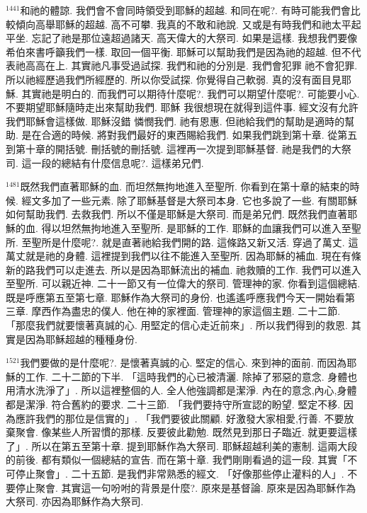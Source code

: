 \documentclass{book}
\begin{document}
$^{1441}$和祂的體諒.
我們會不會同時領受到耶穌的超越.
和同在呢?.
有時可能我們會比較傾向高舉耶穌的超越.
高不可攀.
我真的不敢和祂說.
又或是有時我們和祂太平起平坐.
忘記了祂是那位遠超過諸天.
高天偉大的大祭司.
如果是這樣.
我想我們要像希伯來書呼籲我們一樣.
取回一個平衡.
耶穌可以幫助我們是因為祂的超越.
但不代表祂高高在上.
其實祂凡事受過試探.
我們和祂的分別是.
我們會犯罪 祂不會犯罪.
所以祂經歷過我們所經歷的.
所以你受試探.
你覺得自己軟弱.
真的沒有面目見耶穌.
其實祂是明白的.
而我們可以期待什麼呢?.
我們可以期望什麼呢?.
可能要小心.
不要期望耶穌隨時走出來幫助我們.
耶穌 我很想現在就得到這件事.
經文沒有允許我們耶穌會這樣做.
耶穌沒錯 憐憫我們.
祂有恩惠.
但祂給我們的幫助是適時的幫助.
是在合適的時候.
將對我們最好的東西賜給我們.
如果我們跳到第十章.
從第五到第十章的開括號.
刪括號的刪括號.
這裡再一次提到耶穌基督.
祂是我們的大祭司.
這一段的總結有什麼信息呢?.
這樣弟兄們.

$^{1481}$既然我們直著耶穌的血.
而坦然無拘地進入至聖所.
你看到在第十章的結束的時候.
經文多加了一些元素.
除了耶穌基督是大祭司本身.
它也多說了一些.
有關耶穌如何幫助我們.
去救我們.
所以不僅是耶穌是大祭司.
而是弟兄們.
既然我們直著耶穌的血.
得以坦然無拘地進入至聖所.
是耶穌的工作.
耶穌的血讓我們可以進入至聖所.
至聖所是什麼呢?.
就是直著祂給我們開的路.
這條路又新又活.
穿過了萬丈.
這萬丈就是祂的身體.
這裡提到我們以往不能進入至聖所.
因為耶穌的補血.
現在有條新的路我們可以走進去.
所以是因為耶穌流出的補血.
祂救贖的工作.
我們可以進入至聖所.
可以親近神.
二十一節又有一位偉大的祭司.
管理神的家.
你看到這個總結.
既是呼應第五至第七章.
耶穌作為大祭司的身份.
也遙遙呼應我們今天一開始看第三章.
摩西作為盡忠的僕人.
他在神的家裡面.
管理神的家這個主題.
二十二節.
「那麼我們就要懷著真誠的心.
用堅定的信心走近前來」.
所以我們得到的救恩.
其實是因為耶穌超越的種種身份.

$^{1521}$我們要做的是什麼呢?.
是懷著真誠的心.
堅定的信心.
來到神的面前.
而因為耶穌的工作.
二十二節的下半.
「這時我們的心已被清灑.
除掉了邪惡的意念.
身體也用清水洗淨了」.
所以這裡整個的人.
全人他強調都是潔淨.
內在的意念,內心,身體都是潔淨.
符合舊約的要求.
二十三節.
「我們要持守所宣認的盼望.
堅定不移.
因為應許我們的那位是信實的」.
「我們要彼此關顧.
好激發大家相愛,行善.
不要放棄聚會.
像某些人所習慣的那樣.
反要彼此勸勉.
既然見到那日子臨近.
就更要這樣了」.
所以在第五至第十章.
提到耶穌作為大祭司.
耶穌超越利美的憲制.
這兩大段的前後.
都有類似一個總結的宣告.
而在第十章.
我們剛剛看過的這一段.
其實「不可停止聚會」.
二十五節.
是我們非常熟悉的經文.
「好像那些停止灌料的人」.
不要停止聚會.
其實這一句吩咐的背景是什麼?.
原來是基督論.
原來是因為耶穌作為大祭司.
亦因為耶穌作為大祭司.
\end{document}
